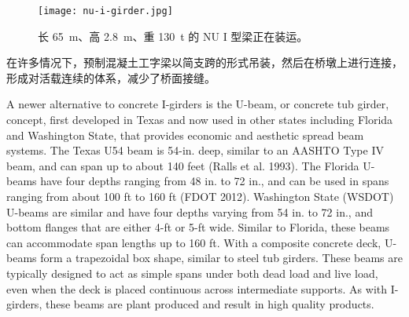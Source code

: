 \begin{figure}
  \texttt{[image: nu-i-girder.jpg]}
  \caption{长 \qty{65}{m}、高 \qty{2.8}{m}、重 \qty{130}{t} 的 NU I 型梁正在装运。}
  \label{fig:nu-i-girder}
\end{figure}

在许多情况下，预制混凝土工字梁以简支跨的形式吊装，然后在桥墩上进行连接，形成对活载连续的体系，减少了桥面接缝。

A newer alternative to concrete I-girders is the U-beam, or concrete tub girder, concept, first developed in Texas and now used in other states including Florida and Washington State, that provides economic and aesthetic spread beam systems. The Texas U54 beam is 54-in. deep, similar to an AASHTO Type IV beam, and can span up to about 140 feet (Ralls et al. 1993). The Florida U-beams have four depths ranging from 48 in. to 72 in., and can be used in spans ranging from about 100 ft to 160 ft (FDOT 2012). Washington State (WSDOT) U-beams are similar and have four depths varying from 54 in. to 72 in., and bottom flanges that are either 4-ft or 5-ft wide. Similar to Florida, these beams can accommodate span lengths up to 160 ft. With a composite concrete deck, U- beams form a trapezoidal box shape, similar to steel tub girders. These beams are typically designed to act as simple spans under both dead load and live load, even when the deck is placed continuous across intermediate supports. As with I-girders, these beams are plant produced and result in high quality products.

